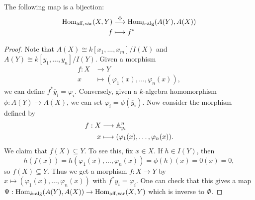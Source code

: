 \begin{prop}
  The following map is
  a bijection:
  \begin{align*}
    \operatorname{Hom}_{\mathrm{aff,var}}(X, Y)
    &\overset{\Phi}{\longrightarrow}
    \operatorname{Hom}_{k\text{-}\mathrm{alg}}(A(Y), A(X)) \\
    f &\longmapsto f^*
  \end{align*}
\end{prop}

\begin{proof}
  Note that
  $A(X) \cong k[x_1, \dots, x_m]/I(X)$
  and $A(Y) \cong k[y_1, \dots, y_n]/I(Y)$.
  Given a morphism
  \begin{align*}
    f : X &\longrightarrow Y \\
    x &\longmapsto (\varphi_1(x), \dots, \varphi_n(x)),
  \end{align*}
  we can define
  $f^* \overline{y}_i = \varphi_i$.
  Conversely, given a
  $k$-algebra homomorphism
  $\phi : A(Y) \to A(X)$, we can set
  $\varphi_i = \phi(\overline{y}_i)$.
  Now consider the morphism defined by
  \begin{align*}
    f : X
    &\longrightarrow \mathbb{A}^n_{y_i} \\
    x &\longmapsto (\varphi_1(x), \dots, \varphi_n(x)).
  \end{align*}
  We claim that $f(X) \subseteq Y$.
  To see this, fix $x \in X$. If
  $h \in I(Y)$, then
  \[
    h(f(x))
    = h(\varphi_1(x), \dots, \varphi_n(x))
    = \phi(h)(x)
    = 0(x) = 0,
  \]
  so $f(X) \subseteq Y$. Thus we
  get a morphism $f : X \to Y$ by
  $x \mapsto (\varphi_1(x), \dots, \varphi_n(x))$ with
  $f^* y_i = \varphi_i$. One can check
  that this gives a map
  $\Psi : \operatorname{Hom}_{k\text{-}\mathrm{alg}}(A(Y), A(X)) \to \operatorname{Hom}_{\mathrm{aff,var}}(X, Y)$
  which is inverse to $\Phi$.
\end{proof}

